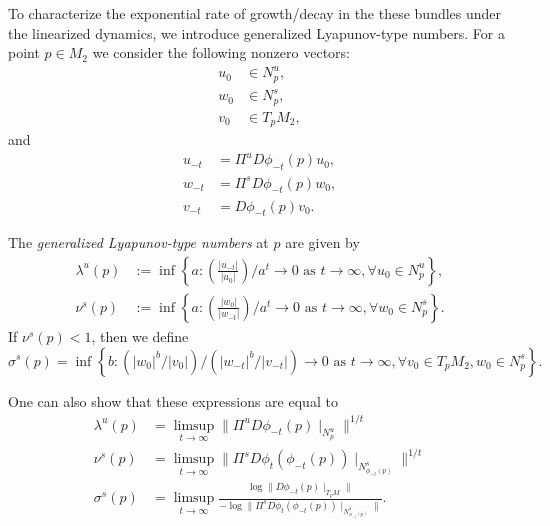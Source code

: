 To characterize the exponential rate of growth/decay in the these bundles under the linearized dynamics, we introduce generalized Lyapunov-type numbers. For a point \(p \in M_2\) we consider the following nonzero vectors:
\begin{equation*}
	\begin{aligned}
		u_0 &\in N^u_p, \\
		w_0 &\in N^s_p, \\
		v_0 &\in T_p M_2,
	\end{aligned}
\end{equation*}
and 
\begin{equation*}
	\begin{aligned}
		u_{-t} &= \Pi^u D\phi_{-t}(p) u_0, \\
		w_{-t} &= \Pi^s D\phi_{-t}(p) w_0, \\
		v_{-t} &= D\phi_{-t}(p) v_0.
	\end{aligned}
\end{equation*}
\begin{defn}
	The \emph{generalized Lyapunov-type numbers} at \(p\) are given by
	\begin{align*}
		\lambda^u(p) &:= \inf \left\{ a : \left( \frac{|u_{-t}|}{|u_0|}\right) /  a^t \to 0  \text{ as }t\to\infty, \forall u_0 \in N^u_p \right\} ,\\
		\nu^s(p) &:= \inf \left\{ a : \left( \frac{|w_{0}|}{|w_{-t}|}\right) /  a^t \to 0  \text{ as }t\to\infty, \forall w_0 \in N^s_p \right\}.
	\end{align*}
	If \(\nu^s(p) < 1\), then we define
	\begin{equation*}
		\sigma^s(p) = \inf \left\{ b: (|w_0|^b /|v_0|) / (|w_{-t}|^b/ |v_{-t}| ) \to 0 \text{ as } t\to \infty, \forall v_0 \in T_pM_2, w_0 \in N^s_p  \right\}.
	\end{equation*}
\end{defn}
One can also show that these expressions are equal to 
\begin{align*}
	\lambda^u(p) &= \limsup_{t\to\infty} \|\Pi^u D\phi_{-t}(p) \mid_{N^u_p} \| ^{1/t} \\
	\nu^s(p) &= \limsup_{t\to\infty} \|\Pi^s D\phi_t(\phi_{-t} (p) ) \mid_{N^s_{\phi_{-t}(p)}} \|^{1/t} \\
	\sigma^s(p) &= \limsup_{t\to\infty} \frac{ \log \| D\phi_{-t}(p) \mid_{T_pM}\|}{-\log\| \Pi^s D\phi_t(\phi_{-t}(p)) \mid_{N^s_{\phi_{-t}(p)} } \|}.
\end{align*}


